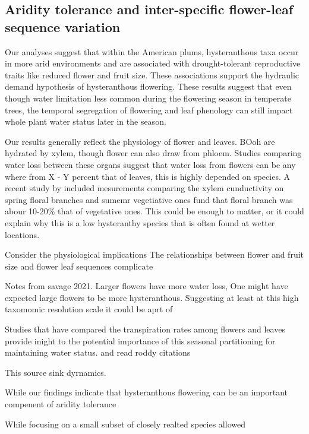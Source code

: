 \documentclass{article}[11pt]
\begin{document}
\subsection*{Aridity tolerance and inter-specific flower-leaf sequence variation}

Our analyses suggest that within the American plums, hysteranthous taxa occur in more arid environments and are associated with drought-tolerant reproductive traits like reduced flower and fruit size. These associations support the hydraulic demand hypothesis of hysteranthous flowering. These results suggest that even though water limitation less common during the flowering season in temperate trees, the temporal segregation of flowering and leaf phenology can still impact whole plant water status later in the season.

Our results generally reflect the physiology of flower and leaves. BOoh are hydrated by xylem, though flower can also draw from phloem. Studies comparing water loss between these organs suggest that water loss from flowers can be any where from X - Y percent that of leaves, this is highly depended on species.
A recent study by \citet{} included mesurements comparing the xylem cunductivity on spring floral branches and sumemr vegetiative ones fund that floral branch was abour 10-20\% that of vegetative ones. 
This could be enough to matter, or it could explain why this is a low hysteranthy species that is often found at wetter locations.

Consider the physiological implications
The relationships between flower and fruit size and flower leaf sequences complicate


Notes from savage 2021. Larger flowers have more water loss, One might have expected large flowers to be more hysteranthous. Suggesting at least at this high taxomomic resolution scale it could be aprt of 



Studies that have compared the transpiration rates among flowers and leaves provide inight to the potential importance of this seasonal partitioning for maintaining water status. \citep{Liu:2017wg,Whiley:1988uf,Galen:1999vr,Lambrecht:2007ur,Roddy:2019wb} and read roddy citations

This source sink dyrnamics.



While our findings indicate that hysteranthous flowering can be an important compenent of aridity tolerance

While focusing on a small subset of closely realted species allowed
\end{document}
